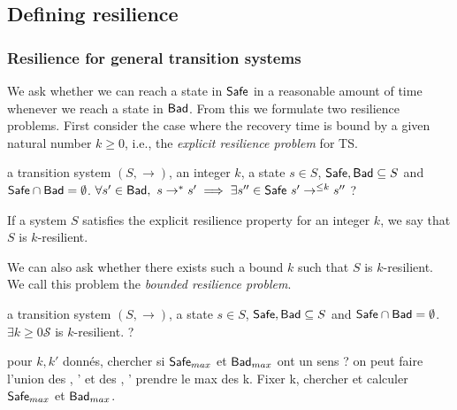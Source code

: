 
\iffalse
\subsection{Defining resilience}


\subsubsection{Resilience for general transition systems}


We ask whether we can reach a state 
in 
%
$\textsf{Safe}$  in a reasonable amount of time whenever we reach a state 
in
%
$\textsf{Bad}$. 
From this we formulate two resilience problems. First consider the case where the recovery time
is bound by a given natural number $k \geq 0$, i.e., the \emph{explicit resilience problem} for TS.

{a transition system $(S,\rightarrow)$, an integer $k$, a state $s \in S$, $\textsf{Safe}, \textsf{Bad} \subseteq S$ and $\textsf{Safe} \cap \textsf{Bad} = \emptyset$.}
{$\forall s' \in \textsf{Bad}, ~ s \rightarrow^* s' \implies \exists s'' \in \textsf{Safe} ~ s' \rightarrow^{\leq k} s''$ ?\newline}

If a system $S$ satisfies the explicit resilience property for an integer $k$, we say that $S$ is $k$-resilient.


We can also ask whether there exists such a bound $k$ such that $S$ is $k$-resilient. We call this problem the \emph{bounded resilience problem}.

%
%


{a transition system $(S,\rightarrow)$, a state $s \in S$, $\textsf{Safe}, \textsf{Bad} \subseteq S$ and $\textsf{Safe} \cap \textsf{Bad} = \emptyset$.}
{$\exists k \geq 0  \mathscr{S}$ is $k$-resilient. ?\newline}



pour $k,k'$ donnés, chercher si $\textsf{Safe}_{max}$ et $\textsf{Bad}_{max}$ ont un sens ? on peut faire l'union des \Safe, \Safe' et des \Bad, \Bad' prendre le max des k. Fixer k, chercher et calculer $\textsf{Safe}_{max}$ et $\textsf{Bad}_{max}$.

